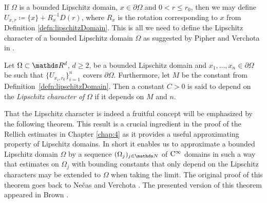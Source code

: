   If $\Omega$ is a bounded Lipschitz domain, $x \in \partial\Omega$ and $0 < r \leq r_0$, then we may define $U_{x,r} \coloneqq \{ x\} + R_x^{-1} D(r)$, where $R_x$ is the rotation corresponding to $x$ from Definition \ref{defn:lipschitzDomain}.
  This is all we need to define the Lipschitz character of a bounded Lipschitz domain $\Omega$ as suggested by Pipher and Verchota in \cite[Sec.\@~5]{pipherVerchota}.

  \begin{defn}
    Let $\Omega \subset \R^d$, $d \geq 2$, be a bounded Lipschitz domain and $x_1, \dots,x_n \in \partial\Omega$ be such that $\{U_{x_i,r_0} \}_{i = 1}^n$ covers $\partial\Omega$.  
    Furthermore, let $M$ be the constant from Definition~\ref{defn:lipschitzDomain}.
    Then a constant $C > 0$ is said to depend on the \emph{Lipschitz character of} $\Omega$ if it depends on $M$ and $n$.
  \end{defn}

  That the Lipschitz character is indeed a fruitful concept will be emphasized by the following theorem.
  This result is a crucial ingredient in the proof of the Rellich estimates in Chapter \ref{chap:4} as it provides a useful approximating property of Lipschitz domains. In short it enables us to approximate a bounded Lipschitz domain $\Omega$ by a sequence $(\Omega_j)_{j \in \N}$ of $\mathrm{C}^\infty$ domains in such a way that estimates on $\Omega_j$ with bounding constants that only depend on the Lipschitz characters may be extended to $\Omega$ when taking the limit.
  The original proof of this theorem goes back to Ne\v{c}as \cite{necas} and Verchota \cite{verchota}. 
  The presented version of this theorem appeared in Brown \cite{brown}.

